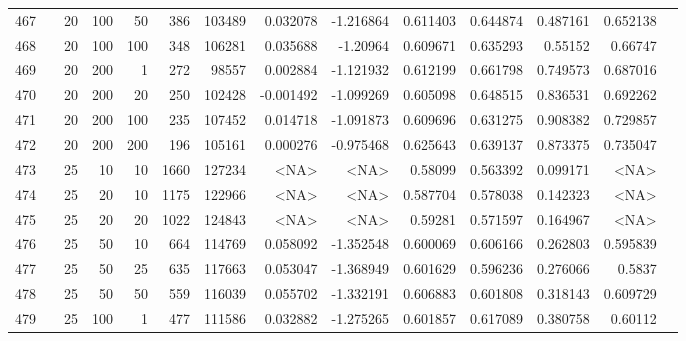 \begin{longtable}{llrrrrrrrrrrrr}
		467 & &           20 &               100 &           50 &          386 &     103489 &  0.032078 & -1.216864 &  0.611403 &    0.644874 &       0.487161 &  0.652138 \\
		468 & &           20 &               100 &          100 &          348 &     106281 &  0.035688 &  -1.20964 &  0.609671 &    0.635293 &        0.55152 &   0.66747 \\
		469 & &           20 &               200 &            1 &          272 &      98557 &  0.002884 & -1.121932 &  0.612199 &    0.661798 &       0.749573 &  0.687016 \\
		470 & &           20 &               200 &           20 &          250 &     102428 & -0.001492 & -1.099269 &  0.605098 &    0.648515 &       0.836531 &  0.692262 \\
		471 & &           20 &               200 &          100 &          235 &     107452 &  0.014718 & -1.091873 &  0.609696 &    0.631275 &       0.908382 &  0.729857 \\
		472 & &           20 &               200 &          200 &          196 &     105161 &  0.000276 & -0.975468 &  0.625643 &    0.639137 &       0.873375 &  0.735047 \\
		473 & &           25 &                10 &           10 &           1660 &     127234 &      <NA> &      <NA> &   0.58099 &    0.563392 &       0.099171 &  <NA> \\
		474 & &           25 &                20 &           10 &           1175 &     122966 &      <NA> &      <NA> &  0.587704 &    0.578038 &       0.142323 &  <NA> \\
		475 & &           25 &                20 &           20 &           1022 &     124843 &      <NA> &      <NA> &   0.59281 &    0.571597 &       0.164967 &  <NA> \\
		476 & &           25 &                50 &           10 &          664 &     114769 &  0.058092 & -1.352548 &  0.600069 &    0.606166 &       0.262803 &  0.595839 \\
		477 & &           25 &                50 &           25 &          635 &     117663 &  0.053047 & -1.368949 &  0.601629 &    0.596236 &       0.276066 &    0.5837 \\
		478 & &           25 &                50 &           50 &          559 &     116039 &  0.055702 & -1.332191 &  0.606883 &    0.601808 &       0.318143 &  0.609729 \\
		479 & &           25 &               100 &            1 &          477 &     111586 &  0.032882 & -1.275265 &  0.601857 &    0.617089 &       0.380758 &   0.60112 \\

\end{longtable}
